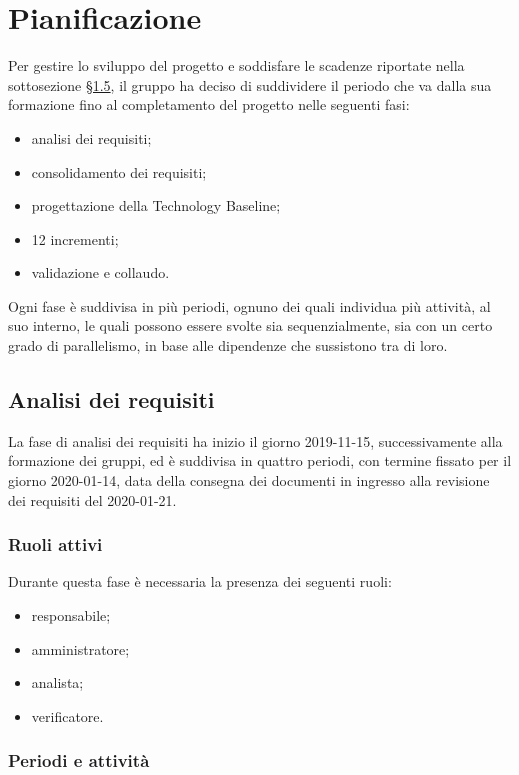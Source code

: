 \section{Pianificazione}

	Per gestire lo sviluppo del progetto e soddisfare le scadenze riportate nella sottosezione \hyperref[riferimento_scadenze]{\S1.5}, il gruppo ha deciso di suddividere il periodo che va dalla sua formazione fino al completamento del progetto nelle seguenti fasi:
	\begin{itemize}
		\item analisi dei requisiti;
		\item consolidamento dei requisiti;
		\item progettazione della Technology Baseline;
		\item 12 incrementi;
		\item validazione e collaudo.
	\end{itemize}
	Ogni fase è suddivisa in più periodi, ognuno dei quali individua più attività, al suo interno, le quali possono essere svolte sia sequenzialmente, sia con un certo grado di parallelismo, in base alle dipendenze che sussistono tra di loro.
	
	\subsection{Analisi dei requisiti}
	
		La fase di analisi dei requisiti ha inizio il giorno 2019-11-15, successivamente alla formazione dei gruppi, ed è suddivisa in quattro periodi, con termine fissato per il giorno 2020-01-14, data della consegna dei documenti in ingresso alla revisione dei requisiti del 2020-01-21.
		
		\subsubsection{Ruoli attivi}
		
			Durante questa fase è necessaria la presenza dei seguenti ruoli:
			\begin{itemize}
				\item responsabile;
				\item amministratore;
				\item analista;
				\item verificatore.
			\end{itemize}
		
		\subsubsection{Periodi e attività}
		
